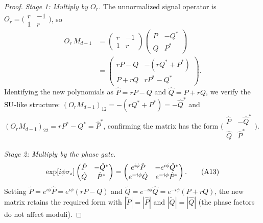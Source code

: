 \begin{proof}
	\textit{Stage 1: Multiply by $O_r$.}
	The unnormalized signal operator is
	$O_r = \bigl(\begin{smallmatrix} r & -1 \\ 1 & r
			\end{smallmatrix}\bigr)$, so
	\begin{align}
		O_r\,M_{d-1}
		&= \begin{pmatrix} r & -1 \\ 1 & r \end{pmatrix}
		\begin{pmatrix} P & -Q^* \\ Q & P^* \end{pmatrix}
		\nonumber\\
		&= \begin{pmatrix} rP - Q & -(rQ^* + P^*) \\
                P + rQ & rP^* - Q^*\end{pmatrix}.
		\tag{A12}
	\end{align}
	Identifying the new polynomials as
	$\hat{P} = rP - Q$ and $\hat{Q} = P + rQ$, we verify
	the $\mathrm{SU}$-like structure:
	$(O_r M_{d-1})_{12} = -(rQ^* + P^*) = -\hat{Q}^*$ and
	$(O_r M_{d-1})_{22} = rP^* - Q^* = \hat{P}^*$,
	confirming the matrix has the form
	$\bigl(\begin{smallmatrix} \hat{P} & -\hat{Q}^* \\
				\hat{Q} & \hat{P}^* \end{smallmatrix}\bigr)$.

	\textit{Stage 2: Multiply by the phase gate.}
	\begin{equation}
		\exp[i\phi\sigma_z]\begin{pmatrix} \hat{P} & -\hat{Q}^* \\ \hat{Q} & \hat{P}^* \end{pmatrix}
		= \begin{pmatrix} e^{i\phi}\hat{P} & -e^{i\phi}\hat{Q}^* \\ e^{-i\phi}\hat{Q} & e^{-i\phi}\hat{P}^* \end{pmatrix}.
		\tag{A13}
	\end{equation}
	Setting $\widetilde{P} = e^{i\phi}\hat{P}
		= e^{i\phi}(rP - Q)$ and
	$\widetilde{Q} = e^{-i\phi}\hat{Q}
		= e^{-i\phi}(P + rQ)$, the new matrix retains the
	required form with $|\widetilde{P}| = |\hat{P}|$ and
	$|\widetilde{Q}| = |\hat{Q}|$ (the phase factors do not
	affect moduli).


\end{proof}

